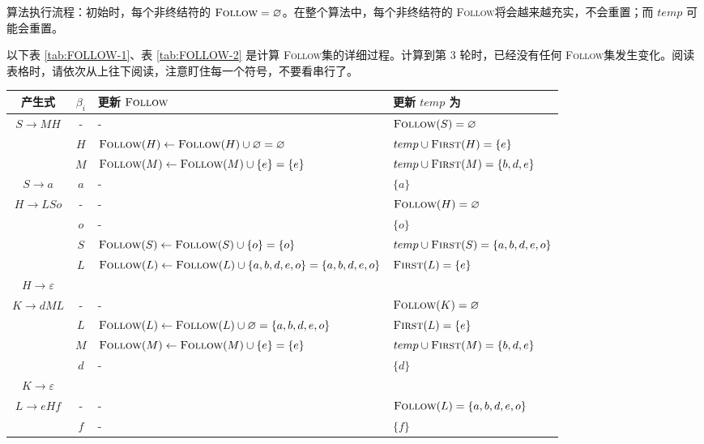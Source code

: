 \documentclass[UTF8]{ctexart}
\newcommand\FIRST{\textsc{First}}
\newcommand\FOLLOW{\textsc{Follow}}
\begin{document}
算法执行流程：初始时，每个非终结符的 $\FOLLOW = \varnothing$。在整个算法中，每个非终结符的 \FOLLOW 将会越来越充实，不会重置；而 $temp$ 可能会重置。

以下表 \ref{tab:FOLLOW-1}、表 \ref{tab:FOLLOW-2} 是计算 \FOLLOW 集的详细过程。计算到第 3 轮时，已经没有任何 \FOLLOW 集发生变化。阅读表格时，请依次从上往下阅读，注意盯住每一个符号，不要看串行了。


\begin{landscape}
\begin{table}[p]
    \centering
    \small
    \begin{tabular}{|c|c|l|l|}
    \hline
        产生式 & $\beta_i$ & 更新 $\FOLLOW$ & 更新 $temp$ 为\\
    \hline
        $S\to MH$ & - & - & $\FOLLOW(S) = \varnothing$ \\
                  & $H$ & $\FOLLOW(H)\gets \FOLLOW(H)\cup\varnothing = \varnothing$ & $temp\cup \FIRST(H) = \{e\}$\\
                  & $M$ & $\FOLLOW(M)\gets \FOLLOW(M)\cup\{e\} = \{e\}$ & $temp\cup\FIRST(M) = \{b,d,e\}$ \\
    \hline
        $S\to a$ & $a$ & - & $\{a\}$ \\
    \hline
        $H\to LSo$ & - & - & $\FOLLOW(H) = \varnothing$ \\
                   & $o$ & - & $\{o\}$ \\
                   & $S$ & $\FOLLOW(S)\gets \FOLLOW(S)\cup \{o\} = \{o\}$ & $temp\cup\FIRST(S) = \{a,b,d,e,o\}$ \\
                   & $L$ & $\FOLLOW(L)\gets \FOLLOW(L)\cup \{a,b,d,e,o\} = \{a,b,d,e,o\}$ & $\FIRST(L) = \{e\}$ \\
    \hline
        $H\to \varepsilon$ &&&\\
    \hline
        $K\to dML$ & - & - & $\FOLLOW(K) = \varnothing$ \\ 
                   & $L$ & $\FOLLOW(L)\gets \FOLLOW(L)\cup\varnothing = \{a,b,d,e,o\}$  & $\FIRST(L) = \{e\}$ \\
                   & $M$ & $\FOLLOW(M)\gets \FOLLOW(M)\cup \{e\} = \{e\}$ & $temp\cup\FIRST(M) = \{b,d,e\}$ \\
                   & $d$ & - & $\{d\}$ \\
    \hline
        $K\to \varepsilon$ &&&\\
    \hline
        $L\to eHf$ & - & - & $\FOLLOW(L) = \{a,b,d,e,o\}$ \\
                   & $f$ & - & $\{f\}$ \\

\end{tabular}
\end{table}
\end{landscape}
\end{document}
